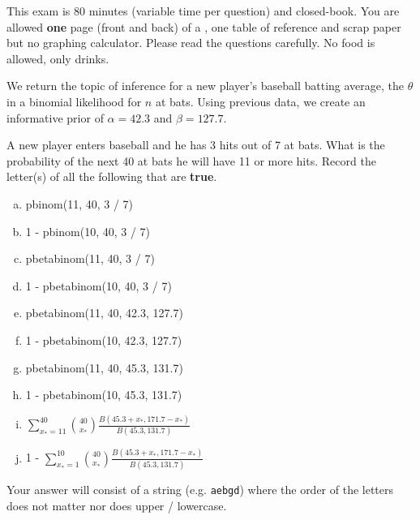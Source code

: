 \documentclass[12pt]{article}
\newcommand{\instr}{Your answer will consist of a string (e.g. \texttt{aebgd}) where the order of the letters does not matter nor does upper / lowercase.}
\begin{document}
This exam is 80 minutes (variable time per question) and closed-book. You are allowed \textbf{one} page (front and back) of a , one table of reference and scrap paper but no graphing calculator. Please read the questions carefully. No food is allowed, only drinks. %

\pagebreak


\problem [8min] We return the topic of inference for a new player's baseball batting average, the $\theta$ in a binomial likelihood for $n$ at bats. Using previous data, we create an informative prior of $\alpha = 42.3$ and $\beta = 127.7$. 

\benum

 A new player enters baseball and he has 3 hits out of 7 at bats. What is the probability of the next 40 at bats he will have 11 or more hits. Record the letter(s) of all the following that are \textbf{true}. 


\begin{enumerate}[(a)]
\item pbinom(11, 40, 3 / 7)
\item 1 - pbinom(10, 40, 3 / 7)
\item pbetabinom(11, 40, 3 / 7)
\item 1 - pbetabinom(10, 40, 3 / 7)
\item pbetabinom(11, 40, 42.3, 127.7)
\item 1 - pbetabinom(10, 42.3, 127.7)
\item pbetabinom(11, 40, 45.3, 131.7)
\item 1 - pbetabinom(10, 45.3, 131.7)
\item $\displaystyle\sum_{x_* = 11}^{40} \binom{40}{x_*} \frac{B(45.3 +x_*, 171.7 - x_*)}{B(45.3, 131.7)}$
\item 1 - $\displaystyle\sum_{x_* = 1}^{10} \binom{40}{x_*} \frac{B(45.3 +x_*, 171.7 - x_*)}{B(45.3, 131.7)}$
\end{enumerate}
\eenum\instr\pagebreak
\end{document}
